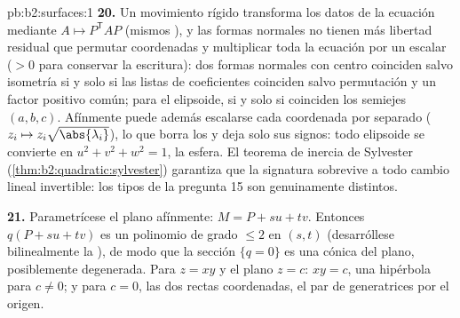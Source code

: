 \begin{solution}{pb:b2:surfaces:1}
\textbf{20.} Un movimiento rígido transforma los datos de la ecuación
mediante $A \mapsto P^{\mathsf T}\!AP$ (mismos ), y
las formas normales no tienen más libertad residual que permutar
coordenadas y multiplicar toda la ecuación por un escalar ($> 0$ para
conservar la escritura): dos formas normales con centro coinciden
salvo isometría si y solo si las listas de coeficientes coinciden
salvo permutación y un factor positivo común; para el elipsoide, si y
solo si coinciden los semiejes $(a, b, c)$. Afínmente puede además
escalarse cada coordenada por separado ($z_i \mapsto z_i\sqrt{\abs
{\lambda_i}}$), lo que borra los  y deja solo sus
signos: todo elipsoide se convierte en $u^2 + v^2 + w^2 = 1$, la
esfera. El teorema de inercia de Sylvester
(\cref{thm:b2:quadratic:sylvester}) garantiza que la signatura
sobrevive a todo cambio lineal invertible: los tipos  de la
pregunta 15 son genuinamente distintos.

\textbf{21.} Parametrícese el plano afínmente: $M = P + su + tv$.
Entonces $q(P + su + tv)$ es un polinomio de grado $\leq 2$ en $(s,
t)$ (desarróllese bilinealmente la ), de modo que la
sección $\{q = 0\}$ es una cónica del plano, posiblemente degenerada.
Para $z = xy$ y el plano $z = c$: $xy = c$, una hipérbola para $c
\neq 0$; y para $c = 0$, las dos rectas coordenadas, el par de
generatrices por el origen.


\end{solution}
